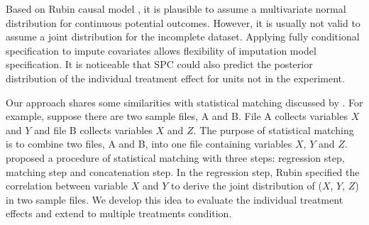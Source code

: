 	Based on Rubin causal model \citep[Ch 8]{imbens2015causal}, it is plausible to assume a multivariate normal distribution for continuous potential outcomes. However, it is usually not valid to assume a joint distribution for the incomplete dataset. Applying fully conditional specification to impute covariates allows flexibility of imputation model specification. It is noticeable that SPC could also predict the posterior distribution of the individual treatment effect for units not in the experiment.  
	
	Our approach shares some similarities with statistical matching discussed by \citep{moriarity2003note}. For example, suppose there are two sample files, A and B. File A collects variables $X$ and $Y$ and file B collects variables $X$ and $Z$. The purpose of statistical matching is to combine two files, A and B, into one file containing variables $X$, $Y$ and $Z$. \citet{rubin1986statistical} proposed a procedure of statistical matching with three steps: regression step, matching step and concatenation step. In the regression step, Rubin specified the correlation between variable $X$ and $Y$ to derive the joint distribution of ($X$, $Y$, $Z$) in two sample files. We develop this idea to evaluate the individual treatment effects and extend to multiple treatments condition.  
	

